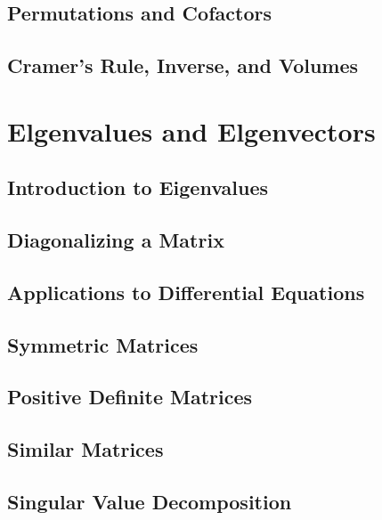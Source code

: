\documentclass{book}
\begin{document}
\section{Permutations and Cofactors}

\section{Cramer's Rule, Inverse, and Volumes}








\chapter{Elgenvalues and Elgenvectors}
\section{Introduction to Eigenvalues}

\section{Diagonalizing a Matrix}

\section{Applications to Differential Equations}

\section{Symmetric Matrices}

\section{Positive Definite Matrices}

\section{Similar Matrices}

\section{Singular Value Decomposition}
\end{document}
